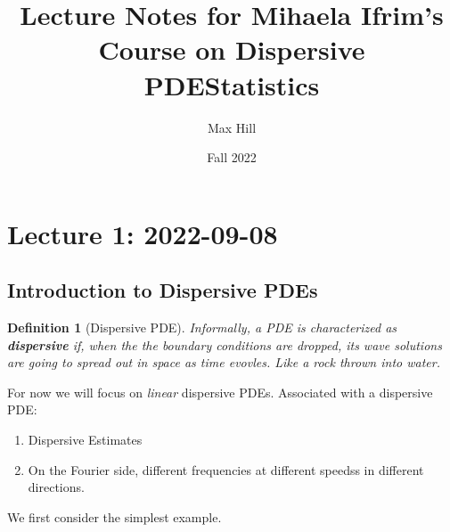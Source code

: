 \documentclass{article}
\title{Lecture Notes for Mihaela Ifrim's Course on Dispersive PDE}
\date{Fall 2022}
\newtheorem{definition}{Definition}
\begin{document}
\title{Statistics }
\author{Max Hill}
\maketitle
\tableofcontents
\newpage

\section{Lecture 1: 2022-09-08}
\subsection{Introduction to Dispersive PDEs}
\begin{definition}[Dispersive PDE]
  Informally, a PDE is characterized as \textbf{dispersive} if, when the the
  boundary conditions are dropped, its wave solutions are going to spread out in
  space as time evovles. Like a rock thrown into water.
\end{definition}

For now we will focus on \textit{linear} dispersive PDEs. Associated with a
dispersive PDE:
\begin{enumerate}
  \item Dispersive Estimates
  \item On the Fourier side, different frequencies at different speedss in
  different directions.
\end{enumerate}
We first consider the simplest example.
\end{document}
